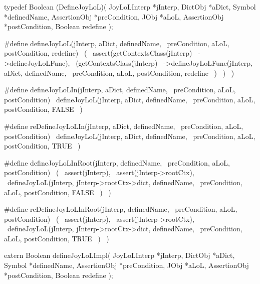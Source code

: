 \startCHeader
typedef Boolean (DefineJoyLoL)(
  JoyLoLInterp *jInterp,
  DictObj      *aDict,
  Symbol       *definedName,
  AssertionObj *preCondition,
  JObj         *aLoL,
  AssertionObj *postCondition,
  Boolean       redefine
);

#define defineJoyLoL(jInterp, aDict, definedName,     \
  preCondition, aLoL, postCondition, redefine)        \
  (                                                   \
    assert(getContextsClass(jInterp)                  \
      ->defineJoyLoLFunc),                            \
    (getContextsClass(jInterp)                        \
      ->defineJoyLoLFunc(jInterp, aDict, definedName, \
        preCondition, aLoL, postCondition, redefine   \
      )                                               \
    )                                                 \
  )

#define defineJoyLoLIn(jInterp, aDict, definedName, \
  preCondition, aLoL, postCondition)                \
  defineJoyLoL(jInterp, aDict, definedName,         \
    preCondition, aLoL, postCondition, FALSE        \
  )

#define reDefineJoyLoLIn(jInterp, aDict, definedName, \
  preCondition, aLoL, postCondition)                  \
  defineJoyLoL(jInterp, aDict, definedName,           \
    preCondition, aLoL, postCondition, TRUE           \
  )

#define defineJoyLoLInRoot(jInterp, definedName,                \
  preCondition, aLoL, postCondition)                            \
  (                                                             \
    assert(jInterp),                                            \
    assert(jInterp->rootCtx),                                   \
    defineJoyLoL(jInterp, jInterp->rootCtx->dict, definedName,  \
      preCondition, aLoL, postCondition, FALSE                  \
    )                                                           \
  )

#define reDefineJoyLoLInRoot(jInterp, definedName,              \
  preCondition, aLoL, postCondition)                            \
  (                                                             \
    assert(jInterp),                                            \
    assert(jInterp->rootCtx),                                   \
    defineJoyLoL(jInterp, jInterp->rootCtx->dict, definedName,  \
      preCondition, aLoL, postCondition, TRUE                   \
    )                                                           \
  )
\stopCHeader

\startCHeader
extern Boolean defineJoyLoLImpl(
  JoyLoLInterp *jInterp,
  DictObj      *aDict,
  Symbol       *definedName,
  AssertionObj *preCondition,
  JObj         *aLoL,
  AssertionObj *postCondition,
  Boolean       redefine
);
\stopCHeader
{}

